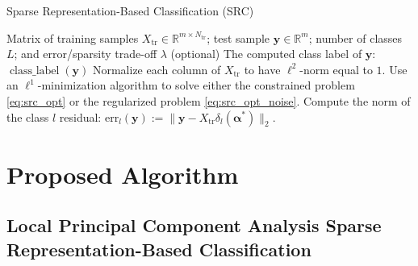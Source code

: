 \documentclass[review]{elsarticle}
\newcommand{\classlabel}{\operatorname{class\_label}}
\begin{document}
\begin{algorithm}
\caption{Sparse Representation-Based Classification (SRC) \cite{wri:src}}
\label{alg:src}
\begin{algorithmic}[1]
\REQUIRE Matrix of training samples $X_\mathrm{tr} \in \mathbb{R}^{m\times N_{\mathrm{tr}}}$; test sample $\bm{y} \in \mathbb{R}^m$; number of classes $L$; and error/sparsity trade-off $\lambda$ (optional)
\ENSURE The computed class label of $\bm{y}$: $\classlabel(\bm{y})$
\STATE Normalize each column of $X_\mathrm{tr}$ to have $\ell^2$-norm equal to $1$.
\STATE Use an $\ell^1$-minimization algorithm to solve either the constrained problem \eqref{eq:src_opt} or the regularized problem \eqref{eq:src_opt_noise}.
\STATE Compute the norm of the class $l$ residual:
$\mathrm{err}_l(\bm{y}) := \big\|\bm{y} - X_\mathrm{tr}\delta_l(\bm{\alpha}^*)\big\|_2$.
\ENDFOR
\end{algorithmic}
\end{algorithm}





\section{Proposed Algorithm}\label{sec:alg}






\subsection{Local Principal Component Analysis Sparse Representation-Based Classification}
\end{document}
